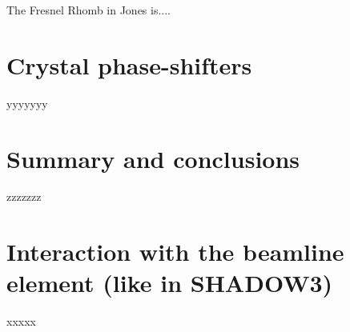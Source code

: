\documentclass{iucr}
\begin{document}
The Fresnel Rhomb in Jones is....
    

    

    

    

    

\section{Crystal phase-shifters}\label{sec:phasesifters}

yyyyyyy


\section{Summary and conclusions}
\label{sec:summary}

zzzzzzz



\appendix

\section{Interaction with the beamline element (like in SHADOW3)}
\label{sec:S3}

xxxxx

\end{document}
